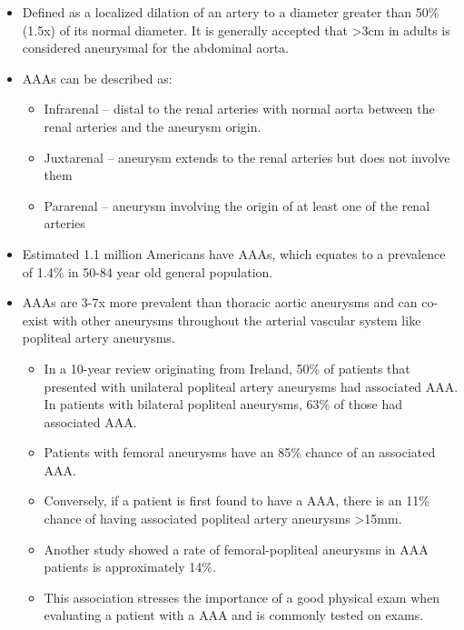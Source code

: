 \documentclass[
]{book}
\begin{document}
\begin{itemize}
\item
  Defined as a localized dilation of an artery to a diameter greater
  than 50\% (1.5x) of its normal diameter. It is generally accepted
  that \textgreater3cm in adults is considered aneurysmal for the abdominal
  aorta.
\item
  AAAs can be described as:

  \begin{itemize}
  \item
    Infrarenal -- distal to the renal arteries with normal aorta
    between the renal arteries and the aneurysm origin.
  \item
    Juxtarenal -- aneurysm extends to the renal arteries but does
    not involve them
  \item
    Pararenal -- aneurysm involving the origin of at least one of
    the renal arteries
  \end{itemize}
\item
  Estimated 1.1 million Americans have AAAs, which equates to a
  prevalence of 1.4\% in 50-84 year old general population.
\item
  AAAs are 3-7x more prevalent than thoracic aortic aneurysms and can
  co-exist with other aneurysms throughout the arterial vascular
  system like popliteal artery aneurysms.

  \begin{itemize}
  \item
    In a 10-year review originating from Ireland, 50\% of patients
    that presented with unilateral popliteal artery aneurysms had
    associated AAA. In patients with bilateral popliteal aneurysms,
    63\% of those had associated AAA.
    \citep{duffyPoplitealAneurysms10year1998}
  \item
    Patients with femoral aneurysms have an 85\% chance of an
    associated AAA. \citep{diwanIncidenceFemoralPopliteal2000}
  \item
    Conversely, if a patient is first found to have a AAA, there is
    an 11\% chance of having associated popliteal artery
    aneurysms \textgreater15mm. \citep{tuvesonPatientsAbdominalAortic2016}
  \item
    Another study showed a rate of femoral-popliteal aneurysms in
    AAA patients is approximately 14\%.
    \citep{diwanIncidenceFemoralPopliteal2000}
  \item
    This association stresses the importance of a good physical exam
    when evaluating a patient with a AAA and is commonly tested on
    exams.
  \end{itemize}
\end{itemize}
\end{document}
